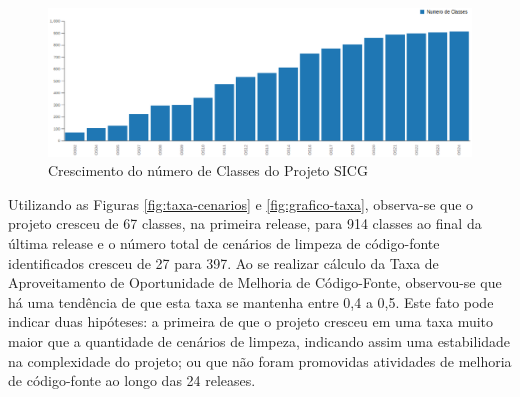 \begin{figure}[H]
\centering
\includegraphics[keepaspectratio=false,scale=0.48]{figuras/crescimento-projeto.eps}
\caption{Crescimento do número de Classes do Projeto SICG}
\label{fig:crescimento-projeto}
\end{figure}
\FloatBarrier


Utilizando as Figuras \ref{fig:taxa-cenarios} e \ref{fig:grafico-taxa}, observa-se que o projeto cresceu de 67 classes, na primeira release, para 914 classes ao final da última release e o número total de cenários de limpeza de código-fonte identificados cresceu de 27 para 397. Ao se realizar cálculo da Taxa de Aproveitamento de Oportunidade de Melhoria de Código-Fonte, observou-se que há uma tendência de que esta taxa se mantenha entre 0,4 a 0,5. Este fato pode indicar duas hipóteses: a primeira de que o projeto cresceu em uma taxa muito maior que a quantidade de cenários de limpeza, indicando assim uma estabilidade na complexidade do projeto; ou que não foram promovidas atividades de melhoria de código-fonte ao longo das 24 releases.  

